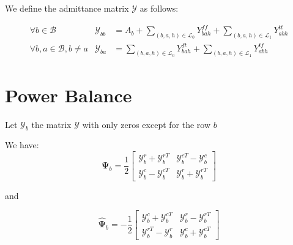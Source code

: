 \documentclass{article}
\begin{document}
We define the admittance matrix \(\mathcal{Y}\) as follows:


\[
    \begin{array}{lll}
        \forall b \in \mathcal{B} & \mathcal{Y}_{bb} &= A_b + \sum\limits_{(b, a, h) \in \mathcal{L}_0} Y^{ff}_{bah} + \sum\limits_{(b, a, h) \in \mathcal{L}_1} Y^{tt}_{abh}\\
        \forall b, a \in \mathcal{B}, b \neq a & \mathcal{Y}_{ba} &= \sum\limits_{(b,a,h) \in \mathcal{L}_0} Y^{ft}_{bah} + \sum\limits_{(b,a,h) \in \mathcal{L}_1} Y^{tf}_{abh}
    \end{array}
\]

\section{Power Balance}

Let \(\mathcal{Y}_b\) the matrix \(\mathcal{Y}\) with only zeros except for the row \(b\)


We have:
\[
    \mathbf{\Psi}_b =
    \frac{1}{2}\begin{bmatrix}
        \mathcal{Y}_b^r + \mathcal{Y}_b^{rT} & \mathcal{Y}_b^{cT} - \mathcal{Y}_b^c \\
        \mathcal{Y}_b^c - \mathcal{Y}_b^{cT} & \mathcal{Y}_b^r + \mathcal{Y}_b^{rT}
    \end{bmatrix}
\]

and

\[
    \hat{\mathbf{\Psi}}_b =
    -\frac{1}{2}\begin{bmatrix}
        \mathcal{Y}_b^c + \mathcal{Y}_b^{cT} & \mathcal{Y}_b^r - \mathcal{Y}_b^{rT} \\
        \mathcal{Y}_b^{rT} - \mathcal{Y}_b^r & \mathcal{Y}_b^c + \mathcal{Y}_b^{cT}
    \end{bmatrix}
\]
\end{document}
